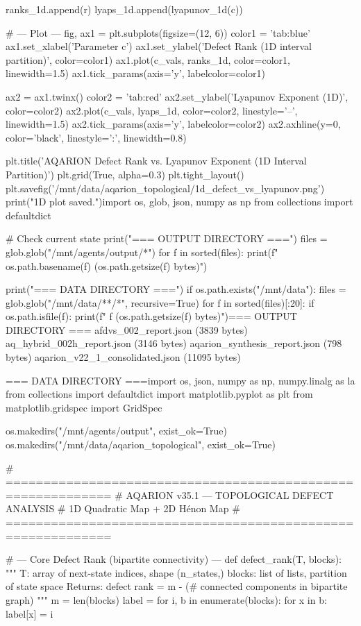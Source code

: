 {{{{{{{{{{{{{    ranks_1d.append(r)
    lyaps_1d.append(lyapunov_1d(c))

# --- Plot ---
fig, ax1 = plt.subplots(figsize=(12, 6))
color1 = 'tab:blue'
ax1.set_xlabel('Parameter c')
ax1.set_ylabel('Defect Rank (1D interval partition)', color=color1)
ax1.plot(c_vals, ranks_1d, color=color1, linewidth=1.5)
ax1.tick_params(axis='y', labelcolor=color1)

ax2 = ax1.twinx()
color2 = 'tab:red'
ax2.set_ylabel('Lyapunov Exponent (1D)', color=color2)
ax2.plot(c_vals, lyaps_1d, color=color2, linestyle='--', linewidth=1.5)
ax2.tick_params(axis='y', labelcolor=color2)
ax2.axhline(y=0, color='black', linestyle=':', linewidth=0.8)

plt.title('AQARION Defect Rank vs. Lyapunov Exponent (1D Interval Partition)')
plt.grid(True, alpha=0.3)
plt.tight_layout()
plt.savefig('/mnt/data/aqarion_topological/1d_defect_vs_lyapunov.png')
print("1D plot saved.")import os, glob, json, numpy as np
from collections import defaultdict

# Check current state
print("=== OUTPUT DIRECTORY ===")
files = glob.glob("/mnt/agents/output/*")
for f in sorted(files):
    print(f"  {os.path.basename(f)} ({os.path.getsize(f)} bytes)")

print("\n=== DATA DIRECTORY ===")
if os.path.exists("/mnt/data"):
    files = glob.glob("/mnt/data/**/*", recursive=True)
    for f in sorted(files)[:20]:
        if os.path.isfile(f):
            print(f"  {f} ({os.path.getsize(f)} bytes)")=== OUTPUT DIRECTORY ===
  afdvs_002_report.json (3839 bytes)
  aq_hybrid_002h_report.json (3146 bytes)
  aqarion_synthesis_report.json (798 bytes)
  aqarion_v22_1_consolidated.json (11095 bytes)

=== DATA DIRECTORY ===import os, json, numpy as np, numpy.linalg as la
from collections import defaultdict
import matplotlib.pyplot as plt
from matplotlib.gridspec import GridSpec

os.makedirs("/mnt/agents/output", exist_ok=True)
os.makedirs("/mnt/data/aqarion_topological", exist_ok=True)

# ============================================================
# AQARION v35.1 — TOPOLOGICAL DEFECT ANALYSIS
# 1D Quadratic Map + 2D Hénon Map
# ============================================================

# --- Core Defect Rank (bipartite connectivity) ---
def defect_rank(T, blocks):
    """
    T: array of next-state indices, shape (n_states,)
    blocks: list of lists, partition of state space
    Returns: defect rank = m - (# connected components in bipartite graph)
    """
    m = len(blocks)
    label = {}
    for i, b in enumerate(blocks):
        for x in b:
            label[x] = i
    
}}}}}}}}}}}}}
